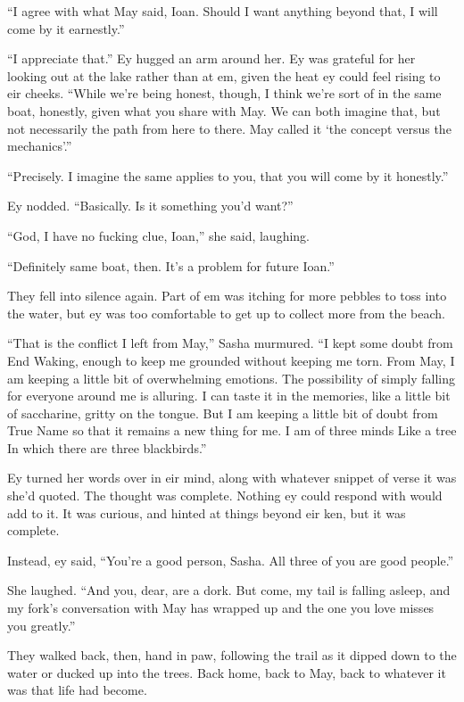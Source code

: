 ``I agree with what May said, Ioan. Should I want anything beyond that, I will come by it earnestly.''

``I appreciate that.'' Ey hugged an arm around her. Ey was grateful for her looking out at the lake rather than at em, given the heat ey could feel rising to eir cheeks. ``While we're being honest, though, I think we're sort of in the same boat, honestly, given what you share with May. We can both imagine that, but not necessarily the path from here to there. May called it `the concept versus the mechanics'.''

``Precisely. I imagine the same applies to you, that you will come by it honestly.''

Ey nodded. ``Basically. Is it something you'd want?''

``God, I have no fucking clue, Ioan,'' she said, laughing.

``Definitely same boat, then. It's a problem for future Ioan.''

They fell into silence again. Part of em was itching for more pebbles to toss into the water, but ey was too comfortable to get up to collect more from the beach.

``That is the conflict I left from May,'' Sasha murmured. ``I kept some doubt from End Waking, enough to keep me grounded without keeping me torn. From May, I am keeping a little bit of overwhelming emotions. The possibility of simply falling for everyone around me is alluring. I can taste it in the memories, like a little bit of saccharine, gritty on the tongue. But I am keeping a little bit of doubt from True Name so that it remains a new thing for me. I am of three minds Like a tree In which there are three blackbirds.''

Ey turned her words over in eir mind, along with whatever snippet of verse it was she'd quoted. The thought was complete. Nothing ey could respond with would add to it. It was curious, and hinted at things beyond eir ken, but it was complete.

Instead, ey said, ``You're a good person, Sasha. All three of you are good people.''

She laughed. ``And you, dear, are a dork. But come, my tail is falling asleep, and my fork's conversation with May has wrapped up and the one you love misses you greatly.''

They walked back, then, hand in paw, following the trail as it dipped down to the water or ducked up into the trees. Back home, back to May, back to whatever it was that life had become.
